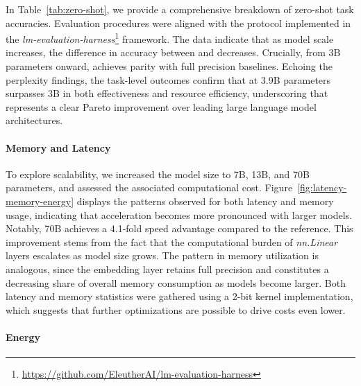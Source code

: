 In Table~\ref{tab:zero-shot}, we provide a comprehensive breakdown of zero-shot task accuracies. Evaluation procedures were aligned with the protocol implemented in the \emph{lm-evaluation-harness}\footnote{\url{https://github.com/EleutherAI/lm-evaluation-harness}} framework. The data indicate that as model scale increases, the difference in accuracy between  and  decreases. Crucially, from 3B parameters onward,  achieves parity with full precision baselines. Echoing the perplexity findings, the task-level outcomes confirm that  at 3.9B parameters surpasses  3B in both effectiveness and resource efficiency, underscoring that  represents a clear Pareto improvement over leading large language model architectures.

\paragraph{Memory and Latency}

To explore scalability, we increased the model size to 7B, 13B, and 70B parameters, and assessed the associated computational cost. Figure~\ref{fig:latency-memory-energy} displays the patterns observed for both latency and memory usage, indicating that acceleration becomes more pronounced with larger models. Notably,  70B achieves a 4.1-fold speed advantage compared to the  reference. This improvement stems from the fact that the computational burden of \emph{nn.Linear} layers escalates as model size grows. The pattern in memory utilization is analogous, since the embedding layer retains full precision and constitutes a decreasing share of overall memory consumption as models become larger. Both latency and memory statistics were gathered using a 2-bit kernel implementation, which suggests that further optimizations are possible to drive costs even lower.

\paragraph{Energy}

